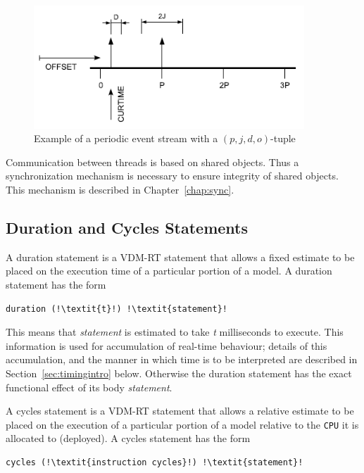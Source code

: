 \documentclass{overturerepchap}
\begin{document}
\begin{figure}[!htb]
\begin{center}
\includegraphics[width=4in]{figures/PeriodJitterDelayOffset.PNG}
\end{center}
\caption{Example of a periodic event stream with a $(p,j,d,o)$-tuple\label{fig:perioddef}}
\end{figure}

Communication between threads is based on shared objects. Thus a
synchronization mechanism is necessary to ensure integrity of shared
objects. This mechanism is described in Chapter~\ref{chap:sync}.

\subsection{Duration and Cycles Statements}

A duration statement is a VDM-RT statement that allows a fixed estimate to
be placed on the execution time of a particular portion of a model. A
duration statement has the form

\begin{lstlisting}
duration (!\textit{t}!) !\textit{statement}!
\end{lstlisting}

This means that \emph{statement} is estimated to take \emph{t} milliseconds 
to execute. This information is used for accumulation of
real-time behaviour; details of this accumulation, and the manner in
which time is to be interpreted are described in
Section~\ref{sec:timingintro} below.  Otherwise the duration statement
has the exact functional effect of its body \textit{statement}.

A cycles statement is a VDM-RT statement that allows a relative
estimate to be placed on the execution of a particular portion of a
model relative to the \texttt{CPU} it is allocated to (deployed). A cycles
statement has the form

\begin{lstlisting}
cycles (!\textit{instruction cycles}!) !\textit{statement}!
\end{lstlisting}
\end{document}
